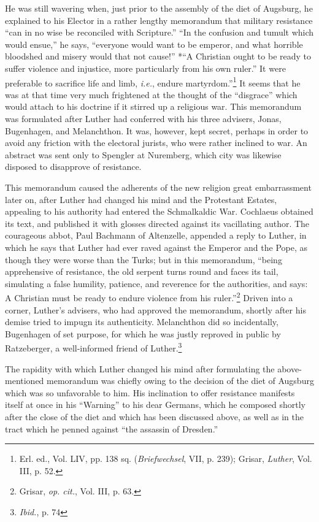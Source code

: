 He was still wavering when, just prior to the assembly of the diet of
Augsburg, he explained to his Elector in a rather lengthy memorandum
that military resistance “can in no wise be reconciled with Scripture.”
“In the confusion and tumult which would ensue,” he says,
“everyone would want to be emperor, and what horrible bloodshed and
misery would that not cause!” *“A Christian ought to be ready to suffer
violence and injustice, more particularly from his own ruler.” It were
preferable to sacrifice life and limb, \textit{i.e.}, endure martyrdom.”\footnote
{Erl. ed., Vol. LIV, pp. 138 sq. (\textit{Briefwechsel}, VII, p. 239); Grisar, \textit{Luther}, Vol. III,
p. 52.}
It seems
that he was at that time very much frightened at the thought of the
“disgrace” which would attach to his doctrine if it stirred up a religious
war. This memorandum was formulated after Luther had conferred
with his three advisers, Jonas, Bugenhagen, and Melanchthon. It was,
however, kept secret, perhaps in order to avoid any friction with the
electoral jurists, who were rather inclined to war. An abstract was sent
only to Spengler at Nuremberg, which city was likewise disposed to disapprove of resistance.

This memorandum caused the adherents of the new religion great
embarrassment later on, after Luther had changed his mind and the
Protestant Estates, appealing to his authority had entered the Schmalkaldic
War. Cochlaeus obtained its text, and published it with glosses
directed against its vacillating author. The courageous abbot, Paul
Bachmann of Altenzelle, appended a reply to Luther, in which he says
that Luther had ever raved against the Emperor and the Pope, as
though they were worse than the Turks; but in this memorandum,
“being apprehensive of resistance, the old serpent turns round and
faces its tail, simulating a false humility, patience, and reverence for
the authorities, and says: A Christian must be ready to endure violence
from his ruler.”\footnote{Grisar, \textit{op. cit.}, Vol. III, p. 63.}
Driven into a corner, Luther’s advisers, who
had approved the memorandum, shortly after his demise tried to impugn
its authenticity. Melanchthon did so incidentally, Bugenhagen
of set purpose, for which he was justly reproved in public by Ratzeberger,
a well-informed friend of Luther.\footnote{\textit{Ibid.}, p. 74}

The rapidity with which Luther changed his mind after formulating the
above-mentioned memorandum was chiefly owing to the
decision of the diet of Augsburg which was so unfavorable to him.
His inclination to offer resistance manifests itself at once in his
“Warning” to his dear Germans, which he composed shortly after
the close of the diet and which has been discussed above, as well as
in the tract which he penned against “the assassin of Dresden.”

